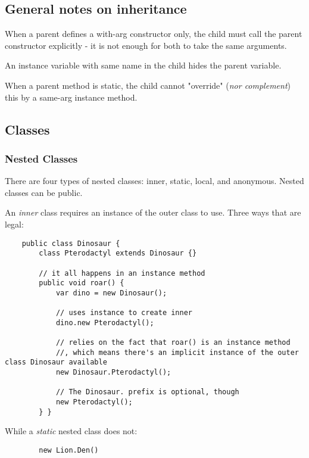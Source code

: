 \documentclass{scrartcl}
\begin{document}
\subsection{General notes on inheritance}

    When a parent defines a with-arg constructor only, the child must call the parent constructor explicitly - it is not enough for both to take the same arguments.

    An instance variable with same name in the child hides the parent variable.

    When a parent method is static, the child cannot "override" (\textit{nor complement}) this by a same-arg instance method.

\subsection{Classes}
\subsubsection{Nested Classes}

    There are four types of nested classes: inner, static, local, and anonymous.
    Nested classes can be public.

    An \textit{inner} class requires an instance of the outer class to use.
    Three ways that are legal:

    \begin{lstlisting}
    public class Dinosaur {
        class Pterodactyl extends Dinosaur {}

        // it all happens in an instance method
        public void roar() {
            var dino = new Dinosaur();

            // uses instance to create inner
            dino.new Pterodactyl();

            // relies on the fact that roar() is an instance method
            //, which means there's an implicit instance of the outer class Dinosaur available
            new Dinosaur.Pterodactyl();

            // The Dinosaur. prefix is optional, though
            new Pterodactyl();
        } }
    \end{lstlisting}

    While a \textit{static} nested class does not:

    \begin{lstlisting}
        new Lion.Den()
    \end{lstlisting}
\end{document}
